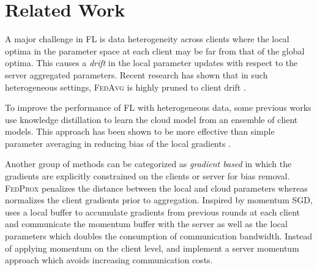 \documentclass[runningheads]{llncs}
\newcommand{\fedavg}{\textsc{FedAvg}\xspace}
\newcommand{\fedprox}{\textsc{FedProx}\xspace}
\begin{document}
\section{Related Work}
\label{subsec:related}

A major challenge in FL is data heterogeneity across clients where the local optima in the parameter space at each client may be far from that of the global optima. This causes a {\it drift} in the local parameter updates with respect to the server aggregated parameters. Recent research has shown that in such heterogeneous settings, \fedavg is highly pruned to client drift \cite{zhao2018federated}. 

To improve the performance of FL with heterogeneous data, some previous works use knowledge distillation to learn the cloud model from an ensemble of client models. This approach has been shown to be more effective than simple parameter averaging in reducing bias of the local gradients \cite{lin2020ensemble,li2019fedmd,zhu2021data}.

Another group of methods can be categorized as {\it gradient based} in which the gradients are explicitly constrained on the clients or server for bias removal. \fedprox \cite{li2020federated} penalizes the distance between the local and cloud parameters whereas \cite{wang2020tackling} normalizes the client gradients prior to aggregation. Inspired by momentum SGD, \cite{yu2019linear} uses a local buffer to accumulate gradients from previous rounds at each client and communicate the momentum buffer with the server as well as the local parameters which doubles the consumption of communication bandwidth. Instead of applying momentum on the client level, \cite{hsu2019measuring} and \cite{wang2019slowmo} implement a server momentum approach which avoids increasing communication costs. 
\end{document}
